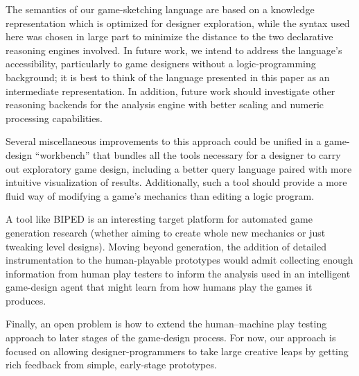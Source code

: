 \documentclass[letterpaper]{article}
\begin{document}
The semantics of our game-sketching language are based on a knowledge
representation which is optimized for designer exploration, while the syntax
used here was chosen in large part to minimize the distance to the two
declarative reasoning engines involved. In future work, we intend to address
the language's accessibility, particularly to game designers without a
logic-programming background; it is best to think of the language presented
in this paper as an intermediate representation.  In addition, future work
should investigate other reasoning backends for the analysis engine with better
scaling and numeric processing capabilities.

Several miscellaneous improvements to this approach could be unified in a
game-design ``workbench'' that bundles all the tools necessary for a designer to
carry out exploratory game design, including a better query language paired
with more intuitive visualization of results. Additionally, such a tool should
provide a more fluid way of modifying a game's mechanics than editing a logic
program.

A tool like BIPED is an interesting target platform for
automated game generation research (whether aiming to create whole new
mechanics or just tweaking level designs). Moving beyond generation, the
addition of detailed instrumentation to the human-playable prototypes would
admit collecting enough information from human play testers to inform the
analysis used in an intelligent game-design agent that might learn from
how humans play the games it produces.

Finally, an open problem is how to extend the human--machine play
testing approach to later stages of the game-design process. For now, our
approach is focused on allowing designer-programmers to take large creative
leaps by getting rich feedback from simple, early-stage prototypes.

{\small
 
}
\end{document}
